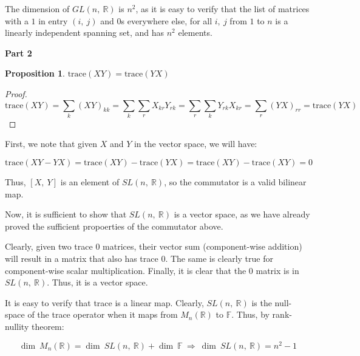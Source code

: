 \documentclass[10pt, oneside]{article}
\newtheorem{prop}{Proposition}
\begin{document}
    The dimension of $GL(n, \ \mathbb{R})$ is $n^2$, as it is easy to verify that the list of matrices
    with a $1$ in entry $(i, \ j)$ and $0$s everywhere else, for all $i, \ j$ from $1$ to $n$ is a linearly independent spanning set, and
    has $n^2$ elements.
    \newline

    \textbf{Part 2}
    \newline

    \begin{prop}
      $\mathrm{trace}(XY) = \mathrm{trace}(YX)$
    \end{prop}

    \begin{proof}
      $$\text{trace}(XY) = \displaystyle\sum_{k} (XY)_{kk} = \displaystyle\sum_{k} \displaystyle\sum_{r} X_{kr} Y_{rk} = \displaystyle\sum_{r} \displaystyle\sum_{k} Y_{rk} X_{kr} = \displaystyle\sum_{r} (YX)_{rr} = \text{trace}(YX)$$
      \end{proof}

    First, we note that given $X$ and $Y$ in the vector space, we will have:

    $$\text{trace}(XY - YX) = \text{trace}(XY) - \text{trace}(YX) = \text{trace}(XY) - \text{trace}(XY) = 0$$

    Thus, $[X, \ Y]$ is an element of $SL(n, \ \mathbb{R})$, so the commutator is a valid bilinear map.
    \newline

    Now, it is sufficient to show that $SL(n, \ \mathbb{R})$ is a vector space, as we have already proved the sufficient propoerties of the commutator
    above.
    \newline

    Clearly, given two trace $0$ matrices, their vector sum (component-wise addition) will result in a matrix that also has trace $0$. The
    same is clearly true for component-wise scalar multiplication. Finally, it is clear that the $0$ matrix is in $SL(n, \ \mathbb{R})$. Thus, it is a vector space.
    \newline

    It is easy to verify that trace is a linear map. Clearly, $SL(n, \ \mathbb{R})$ is the null-space of the trace operator when it maps from
    $M_n(\mathbb{R})$ to $\mathbb{F}$. Thus, by rank-nullity theorem:

    $$\dim \ M_n(\mathbb{R}) = \dim \ SL(n, \ \mathbb{R}) + \dim \ \mathbb{F} \ \Rightarrow \ \dim \ SL(n, \ \mathbb{R}) = n^2 - 1$$
\end{document}
